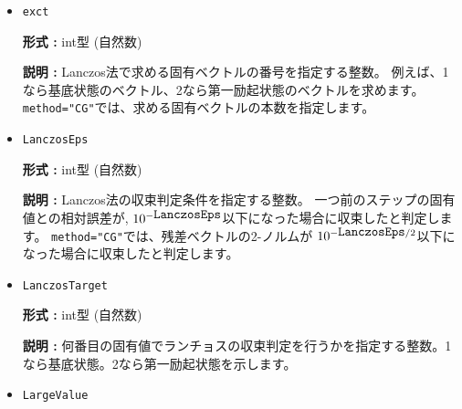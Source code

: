 \begin{itemize}
{\bf 形式 :} int型 (整数)

{\bf 説明 :} 
 {初期条件のベクトルを与えます。}
\begin{itemize}
\item{ランチョス法}
\begin{itemize}
\item{カノニカル集団かつ \verb|initial_iv| $\geq 0$の場合}

ノンゼロの成分が指定されます。

\item{ \verb|initial_iv| $< 0$の場合}

乱数のシードが指定され、全ての成分に対して係数がランダムに与えられます。なお、グランドカノニカルの場合は初期状態として多くの状態を持つよう、こちらの様式が適用されます。
\end{itemize}

\item{TPQ法}

乱数のシードが指定され、全ての成分に対して係数がランダムに与えられます。
\end{itemize}
初期ベクトル設定の詳細については、\ref{Ch:algorithm}を参照ください。
 
 \item  \verb|exct|

{\bf 形式 :} int型 (自然数)

{\bf 説明 :} Lanczos法で求める固有ベクトルの番号を指定する整数。
例えば、1なら基底状態のベクトル、2なら第一励起状態のベクトルを求めます。
\verb|method="CG"|では、求める固有ベクトルの本数を指定します。

\item   \verb|LanczosEps|
   
{\bf 形式 :} int型 (自然数)

{\bf 説明 :} Lanczos法の収束判定条件を指定する整数。
一つ前のステップの固有値との相対誤差が,
$10^{- \verb|LanczosEps|}$以下になった場合に収束したと判定します。
\verb|method="CG"|では、残差ベクトルの2-ノルムが
$10^{- \verb|LanczosEps|/2}$以下になった場合に収束したと判定します。

 \item  \verb|LanczosTarget| 
   
 {\bf 形式 :} int型 (自然数)

  {\bf 説明 :} 何番目の固有値でランチョスの収束判定を行うかを指定する整数。1なら基底状態。2なら第一励起状態を示します。
     
\item \verb|LargeValue|


\end{itemize}

